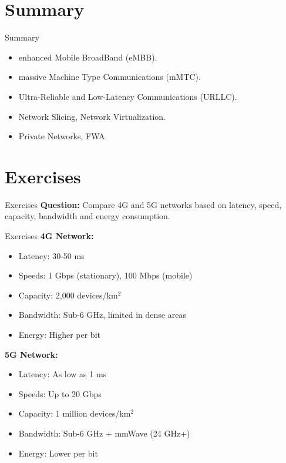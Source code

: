 \documentclass{beamer}
\begin{document}
\section[Summary]{Summary}


\begin{frame}{Summary}
  \begin{itemize}
    \item enhanced Mobile BroadBand (eMBB).
    \vspace*{0.75em}
    \item massive Machine Type Communications (mMTC).
    \vspace*{0.75em}
    \item Ultra-Reliable and Low-Latency Communications (URLLC).
    \vspace*{0.75em}
    \item Network Slicing, Network Virtualization.
    \vspace*{0.75em}
    \item Private Networks, FWA.
  \end{itemize}
\end{frame}



\section[Exercises]{Exercises}


\begin{frame}{Exercises}
  \textbf{Question:} Compare 4G and 5G networks based on latency, speed, capacity, bandwidth and energy consumption.
\end{frame}

\begin{frame}{Exercises}
  \textbf{4G Network:}
  \begin{itemize}
    \item Latency: 30-50 ms
    \item Speeds: 1 Gbps (stationary), 100 Mbps (mobile)
    \item Capacity: 2,000 devices/km\(^2\)
    \item Bandwidth: Sub-6 GHz, limited in dense areas
    \item Energy: Higher per bit
  \end{itemize}
  \vspace{0.5cm}
  \textbf{5G Network:}
  \begin{itemize}
    \item Latency: As low as 1 ms
    \item Speeds: Up to 20 Gbps
    \item Capacity: 1 million devices/km\(^2\)
    \item Bandwidth: Sub-6 GHz + mmWave (24 GHz+)
    \item Energy: Lower per bit
  \end{itemize}
\end{frame}
\end{document}
